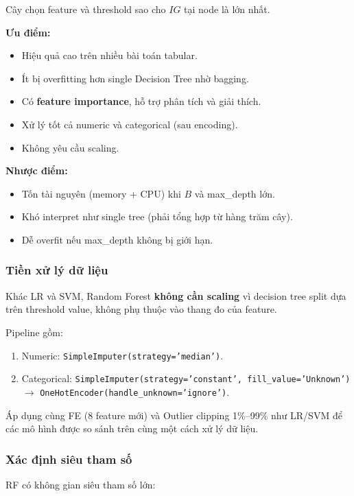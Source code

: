 \documentclass[12pt, a4paper]{article}
\begin{document}
Cây chọn feature và threshold sao cho $IG$ tại node là lớn nhất.

\textbf{Ưu điểm:}
\begin{itemize}
    \item Hiệu quả cao trên nhiều bài toán tabular.
    \item Ít bị overfitting hơn single Decision Tree nhờ bagging.
    \item Có \textbf{feature importance}, hỗ trợ phân tích và giải thích.
    \item Xử lý tốt cả numeric và categorical (sau encoding).
    \item Không yêu cầu scaling.
\end{itemize}

\textbf{Nhược điểm:}
\begin{itemize}
    \item Tốn tài nguyên (memory + CPU) khi $B$ và max\_depth lớn.
    \item Khó interpret như single tree (phải tổng hợp từ hàng trăm cây).
    \item Dễ overfit nếu max\_depth không bị giới hạn.
\end{itemize}

\subsubsection{Tiền xử lý dữ liệu}

Khác LR và SVM, Random Forest \textbf{không cần scaling} vì decision tree split dựa trên threshold value, không phụ thuộc vào thang đo của feature.

Pipeline gồm:
\begin{enumerate}
    \item Numeric: \texttt{SimpleImputer(strategy='median')}.
    \item Categorical: \texttt{SimpleImputer(strategy='constant', fill\_value='Unknown')} $\to$ \texttt{OneHotEncoder(handle\_unknown='ignore')}.
\end{enumerate}

Áp dụng cùng FE (8 feature mới) và Outlier clipping 1\%--99\% như LR/SVM để các mô hình được so sánh trên cùng một cách xử lý dữ liệu.

\subsubsection{Xác định siêu tham số}

RF có không gian siêu tham số lớn:
\end{document}
